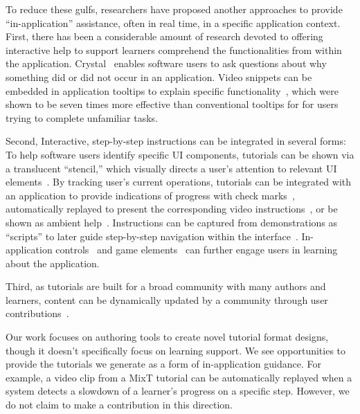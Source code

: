 To reduce these gulfs, researchers have proposed another approaches to provide ``in-application'' assistance, often in real time, in a specific application context.
First, there has been a considerable amount of research devoted to offering interactive help to support learners comprehend the functionalities from within the application.
%
Crystal~\cite{Myers:2006:AWW:1124772.1124832} enables software users to ask questions about why something did or did not occur in an application.
%
Video snippets can be embedded in application tooltips to explain specific functionality~\cite{Grossman:2010wr}, which were shown to be seven times more effective than conventional tooltips for for users trying to complete unfamiliar tasks.

Second, Interactive, step-by-step instructions can be integrated in several forms:
%
To help software users identify specific UI components, tutorials can be shown via a translucent ``stencil,'' which visually directs a user's attention to relevant UI elements~\cite{Kelleher:2005:STD:1054972.1055047}.
%
By tracking user's current operations, tutorials can be integrated with an application to provide indications of progress with check marks~\cite{Fernquist:2011:SRE:2047196.2047245}, automatically replayed to present the corresponding video instructions~\cite{Pongnumkul:2011ju}, or be shown as ambient help~\cite{Matejka:2011:AH:1978942.1979349}.
%
Instructions can be captured from demonstrations as ``scripts'' to later guide step-by-step navigation within the interface~\cite{Bergman:2005:DocWizards}. In-application controls~\cite{Lieberman:2014:SML:2557500.2557543} and game elements~\cite{Li:2014:CGM:2556288.2556954, Dontcheva:2014:CCL:2556288.2557217} can further engage users in learning about the application.

Third, as tutorials are built for a broad community with many authors and learners, content can be dynamically updated by a community through user contributions~\cite{Lafreniere:2013ff,Matejka:2009:CCR:1622176.1622214, Bunt:2014:TPI:2556288.2557118}.

Our work focuses on authoring tools to create novel tutorial format designs, though it doesn't specifically focus on learning support. We see opportunities to provide the tutorials we generate as a form of in-application guidance. For example, a video clip from a MixT tutorial can be automatically replayed when a system detects a slowdown of a learner's progress on a specific step. However, we do not claim to make a contribution in this direction.

